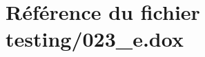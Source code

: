 \hypertarget{023__e_8dox}{}\section{Référence du fichier testing/023\+\_\+e.dox}
\label{023__e_8dox}
